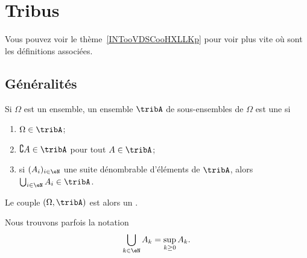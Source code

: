 
\section{Tribus}

Vous pouvez voir le thème~\ref{INTooVDSCooHXLLKp} pour voir plus vite où sont les définitions associées.

\subsection{Généralités}

\begin{definition}  \label{DefjRsGSy}
    Si \( \Omega\) est un ensemble, un ensemble \( \tribA\) de sous-ensembles de \( \Omega\) est une  si
    \begin{enumerate}
        \item
            \( \Omega\in\tribA\);
        \item
            \( \complement A\in \tribA\) pour tout \( A\in\tribA\);
        \item       \label{ItemooPEQNooYiYNtN}
            si \( (A_i)_{i\in \eN}\) une suite dénombrable d'éléments de \( \tribA\), alors \( \bigcup_{i\in \eN}A_i\in\tribA\).
    \end{enumerate}
    Le couple \( (\Omega,\tribA)\) est alors un .
\end{definition}

\begin{remark}
    Nous trouvons parfois la notation
    \begin{equation}
        \bigcup_{k\in \eN}A_k=\sup_{k\geq 0}A_k.
    \end{equation}
\end{remark}


